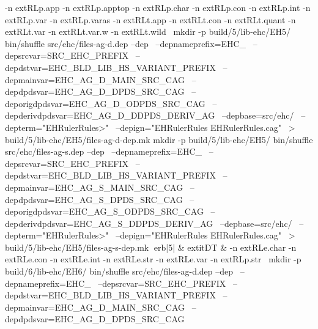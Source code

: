 -n 	extRL{p.app}\hspace{.5em} 
-n 	extRL{p.apptop}\hspace{.5em} 
-n 	extRL{p.char}\hspace{.5em} 
-n 	extRL{p.con}\hspace{.5em} 
-n 	extRL{p.int}\hspace{.5em} 
-n 	extRL{p.var}\hspace{.5em} 
-n 	extRL{p.varas}\hspace{.5em} 
-n 	extRL{t.app}\hspace{.5em} 
-n 	extRL{t.con}\hspace{.5em} 
-n 	extRL{t.quant}\hspace{.5em} 
-n 	extRL{t.var}\hspace{.5em} 
-n 	extRL{t.var.w}\hspace{.5em} 
-n 	extRL{t.wild}\hspace{.5em} 
\
mkdir -p build/5/lib-ehc/EH5/
bin/shuffle src/ehc/files-ag-d.dep --dep \
	  --depnameprefix=EHC_ \
	  --depsrcvar=SRC_EHC_PREFIX \
	  --depdstvar=EHC_BLD_LIB_HS_VARIANT_PREFIX \
	  --depmainvar=EHC_AG_D_MAIN_SRC_CAG \
	  --depdpdsvar=EHC_AG_D_DPDS_SRC_CAG \
	  --deporigdpdsvar=EHC_AG_D_ODPDS_SRC_CAG \
	  --depderivdpdsvar=EHC_AG_D_DDPDS_DERIV_AG \
	  --depbase=src/ehc/ \
	  --depterm="EHRulerRules>" \
	  --depign="EHRulerRules EHRulerRules.cag" \
	    > build/5/lib-ehc/EH5/files-ag-d-dep.mk
mkdir -p build/5/lib-ehc/EH5/
bin/shuffle src/ehc/files-ag-s.dep --dep \
	  --depnameprefix=EHC_ \
	  --depsrcvar=SRC_EHC_PREFIX \
	  --depdstvar=EHC_BLD_LIB_HS_VARIANT_PREFIX \
	  --depmainvar=EHC_AG_S_MAIN_SRC_CAG \
	  --depdpdsvar=EHC_AG_S_DPDS_SRC_CAG \
	  --deporigdpdsvar=EHC_AG_S_ODPDS_SRC_CAG \
	  --depderivdpdsvar=EHC_AG_S_DDPDS_DERIV_AG \
	  --depbase=src/ehc/ \
	  --depterm="EHRulerRules>" \
	  --depign="EHRulerRules EHRulerRules.cag" \
	    > build/5/lib-ehc/EH5/files-ag-s-dep.mk
erb|5| & 	extit{DT} & 
-n 	extRL{e.char}\hspace{.5em} 
-n 	extRL{e.con}\hspace{.5em} 
-n 	extRL{e.int}\hspace{.5em} 
-n 	extRL{e.str}\hspace{.5em} 
-n 	extRL{e.var}\hspace{.5em} 
-n 	extRL{p.str}\hspace{.5em} 
\
mkdir -p build/6/lib-ehc/EH6/
bin/shuffle src/ehc/files-ag-d.dep --dep \
	  --depnameprefix=EHC_ \
	  --depsrcvar=SRC_EHC_PREFIX \
	  --depdstvar=EHC_BLD_LIB_HS_VARIANT_PREFIX \
	  --depmainvar=EHC_AG_D_MAIN_SRC_CAG \
	  --depdpdsvar=EHC_AG_D_DPDS_SRC_CAG \
